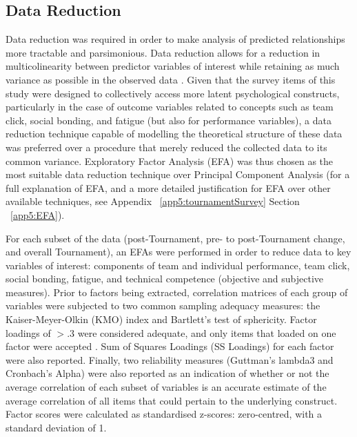 \clearpage


\begin{landscape}






\end{landscape}
\restoregeometry






\subsection{\label{Ch5:dataReduction}Data Reduction}
Data reduction was required in order to make analysis of predicted relationships more tractable and parsimonious. Data reduction allows for a reduction in multicolinearity between predictor variables of interest while retaining as much variance as possible in the observed data \citep{Yong2013}.  Given that the survey items of this study were designed to collectively access more latent psychological constructs, particularly in the case of outcome variables related to concepts such as team click, social bonding, and fatigue (but also for performance variables), a data reduction technique capable of modelling the theoretical structure of these data was preferred over a procedure that merely reduced the collected data to its common variance.  Exploratory Factor Analysis (EFA) was thus chosen as the most suitable data reduction technique over Principal Component Analysis (for a full explanation of EFA, and a more detailed justification for EFA over other available techniques, see Appendix ~\ref{app5:tournamentSurvey} Section ~\ref{app5:EFA}).

For each subset of the data (post-Tournament, pre- to post-Tournament change, and overall Tournament), an EFAs were performed in order to reduce data to key variables of interest: components of team and individual performance, team click, social bonding, fatigue, and technical competence (objective and subjective measures). Prior to factors being extracted, correlation matrices of each group of variables were subjected to two common sampling adequacy measures: the Kaiser-Meyer-Olkin (KMO) index and Bartlett’s test of sphericity.  Factor loadings of $> .3$ were considered adequate, and only items that loaded on one factor were accepted \citep{Field2012}. Sum of Squares Loadings (SS Loadings) for each factor were also reported\citep{Dziuban1974}.  Finally, two reliability measures (Guttman's lambda3 and Cronbach's Alpha) were also reported as an indication of whether or not the average correlation of each subset of variables is an accurate estimate of the average correlation of all items that could pertain to the underlying construct.  Factor scores were calculated as standardised z-scores: zero-centred, with a standard deviation of 1.



